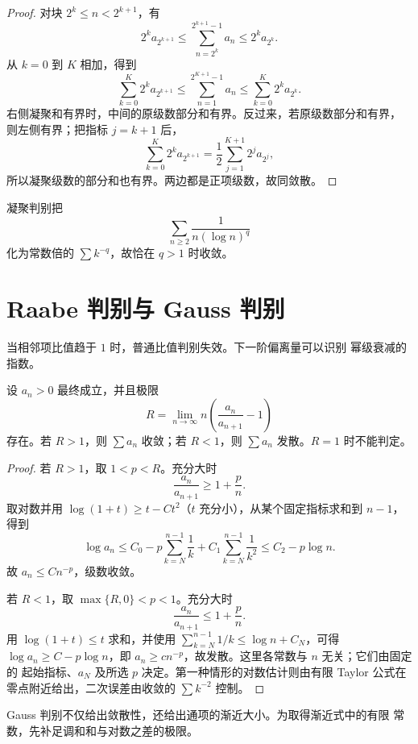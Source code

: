 \begin{proof}
对块 \(2^k\le n<2^{k+1}\)，有
\[
 2^k a_{2^{k+1}}
 \le\sum_{n=2^k}^{2^{k+1}-1}a_n
 \le2^k a_{2^k}.
\]
从 \(k=0\) 到 \(K\) 相加，得到
\[
 \sum_{k=0}^K2^k a_{2^{k+1}}
 \le \sum_{n=1}^{2^{K+1}-1}a_n
 \le \sum_{k=0}^K2^k a_{2^k}.
\]
右侧凝聚和有界时，中间的原级数部分和有界。反过来，若原级数部分和有界，
则左侧有界；把指标 \(j=k+1\) 后，
\[
 \sum_{k=0}^K2^k a_{2^{k+1}}
 =\frac12\sum_{j=1}^{K+1}2^j a_{2^j},
\]
所以凝聚级数的部分和也有界。两边都是正项级数，故同敛散。
\end{proof}

\begin{example}
凝聚判别把
\[
 \sum_{n\ge2}\frac1{n(\log n)^q}
\]
化为常数倍的 \(\sum k^{-q}\)，故恰在 \(q>1\) 时收敛。
\end{example}

\section{Raabe 判别与 Gauss 判别}

当相邻项比值趋于 \(1\) 时，普通比值判别失效。下一阶偏离量可以识别
幂级衰减的指数。

\begin{theorem}[Raabe 判别]
\label{thm:raabe-test}
设 \(a_n>0\) 最终成立，并且极限
\[
 R=\lim_{n\to\infty}
 n\left(\frac{a_n}{a_{n+1}}-1\right)
\]
存在。若 \(R>1\)，则 \(\sum a_n\) 收敛；若 \(R<1\)，则
\(\sum a_n\) 发散。\(R=1\) 时不能判定。
\end{theorem}

\begin{proof}
若 \(R>1\)，取 \(1<p<R\)。充分大时
\[
 \frac{a_n}{a_{n+1}}\ge1+\frac pn.
\]
取对数并用
\(\log(1+t)\ge t-Ct^2\)（\(t\) 充分小），从某个固定指标求和到
\(n-1\)，得到
\[
 \log a_n\le C_0-p\sum_{k=N}^{n-1}\frac1k
              +C_1\sum_{k=N}^{n-1}\frac1{k^2}
 \le C_2-p\log n.
\]
故 \(a_n\le Cn^{-p}\)，级数收敛。

若 \(R<1\)，取 \(\max\{R,0\}<p<1\)。充分大时
\[
 \frac{a_n}{a_{n+1}}\le1+\frac pn.
\]
用 \(\log(1+t)\le t\) 求和，并使用
\(\sum_{k=N}^{n-1}1/k\le \log n+C_N\)，可得
\(\log a_n\ge C-p\log n\)，即
\(a_n\ge c n^{-p}\)，故发散。这里各常数与 \(n\) 无关；它们由固定的
起始指标、\(a_N\) 及所选 \(p\) 决定。第一种情形的对数估计则由有限
Taylor 公式在零点附近给出，二次误差由收敛的 \(\sum k^{-2}\) 控制。
\end{proof}

Gauss 判别不仅给出敛散性，还给出通项的渐近大小。为取得渐近式中的有限
常数，先补足调和和与对数之差的极限。

